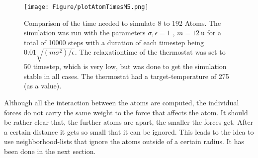 \begin{figure}
	\begin{center}
		\texttt{[image: Figure/plotAtomTimesM5.png]}
	\end{center}
	\caption[Comparison of the time needed to simulate 8 to 192 Atoms]{Comparison of the time needed to simulate 8 to 192 Atoms. The simulation was run with the parameters $\sigma, \epsilon = 1$ , $m = 12~\mathrm{u}$ for a total of 10000 steps with a duration of each $\mathrm{timestep}$ being $0.01\sqrt{(m\sigma^2)/\epsilon} $. The relaxationtime of the thermostat was set to 50 $\mathrm{timestep} $, which is very low, but was done to get the simulation stable in all cases. The thermostat had a target-temperature of 275 (as a value).} 
	\label{PlotSimulationTimeBerendsenThermostat}
\end{figure}

Although all the interaction between the atoms are computed, the individual forces do not carry the same weight to the force that affects the atom. It should be rather clear that, the further atoms are apart, the smaller the forces get. After a certain distance it gets so small that it can be ignored. This leads to the idea to use neighborhood-lists that ignore the atoms outside of a certain radius. It has been done in the next section.

